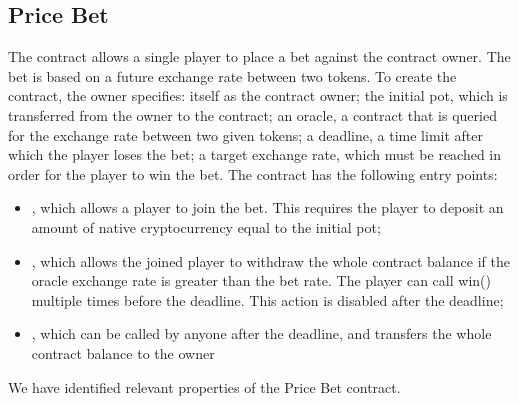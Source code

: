     
    
    


\subsection{Price Bet}

The  contract allows a single player to place a bet against the contract owner. The bet is based on a future exchange rate between two tokens.
To create the contract, the owner specifies:
itself as the contract owner;
the initial pot, which is transferred from the owner to the contract;
an oracle, \ie a contract that is queried for the exchange rate between two given tokens;
a deadline, \ie a time limit after which the player loses the bet;
a target exchange rate, which must be reached in order for the player to win the bet.
The contract has the following entry points:
\begin{itemize}
\item {}, which allows a player to join the bet. This requires the player to deposit an amount of native cryptocurrency equal to the initial pot;
\item {}, which allows the joined player to withdraw the whole contract balance if the oracle exchange rate is greater than the bet rate. The player can call win() multiple times before the deadline. This action is disabled after the deadline;
\item {}, which can be called by anyone after the deadline, and transfers the whole contract balance to the owner
\end{itemize}
%
We have identified \nPricebetProperties relevant properties of the Price Bet contract. 


